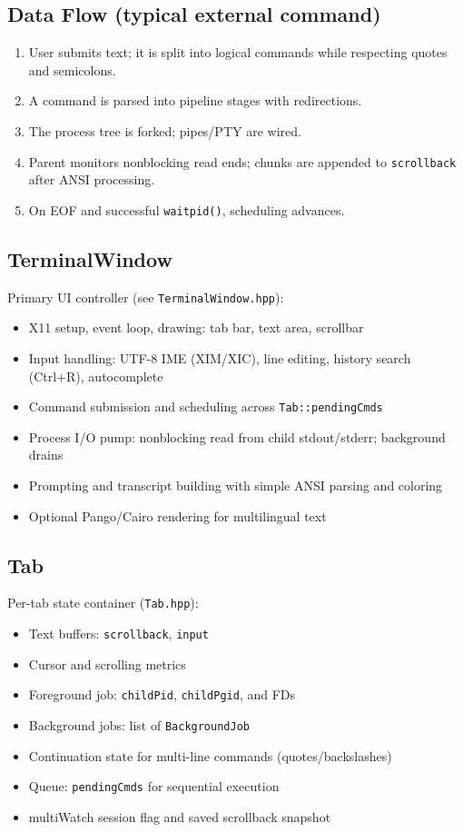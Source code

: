 \documentclass[11pt,a4paper]{article}
\begin{document}
\subsection{Data Flow (typical external command)}
\begin{enumerate}[leftmargin=*]
  \item User submits text; it is split into logical commands while respecting quotes and semicolons.
  \item A command is parsed into pipeline stages with redirections.
  \item The process tree is forked; pipes/PTY are wired.
  \item Parent monitors nonblocking read ends; chunks are appended to \texttt{scrollback} after ANSI processing.
  \item On EOF and successful \texttt{waitpid()}, scheduling advances.
\end{enumerate}

\subsection{TerminalWindow}
Primary UI controller (see \texttt{TerminalWindow.hpp}):
\begin{itemize}[leftmargin=*]
  \item X11 setup, event loop, drawing: tab bar, text area, scrollbar
  \item Input handling: UTF-8 IME (XIM/XIC), line editing, history search (Ctrl+R), autocomplete
  \item Command submission and scheduling across \texttt{Tab::pendingCmds}
  \item Process I/O pump: nonblocking read from child stdout/stderr; background drains
  \item Prompting and transcript building with simple ANSI parsing and coloring
  \item Optional Pango/Cairo rendering for multilingual text
\end{itemize}

\subsection{Tab}
Per-tab state container (\texttt{Tab.hpp}):
\begin{itemize}[leftmargin=*]
  \item Text buffers: \texttt{scrollback}, \texttt{input}
  \item Cursor and scrolling metrics
  \item Foreground job: \texttt{childPid}, \texttt{childPgid}, and FDs
  \item Background jobs: list of \texttt{BackgroundJob}
  \item Continuation state for multi-line commands (quotes/backslashes)
  \item Queue: \texttt{pendingCmds} for sequential execution
  \item multiWatch session flag and saved scrollback snapshot
\end{itemize}
\end{document}
